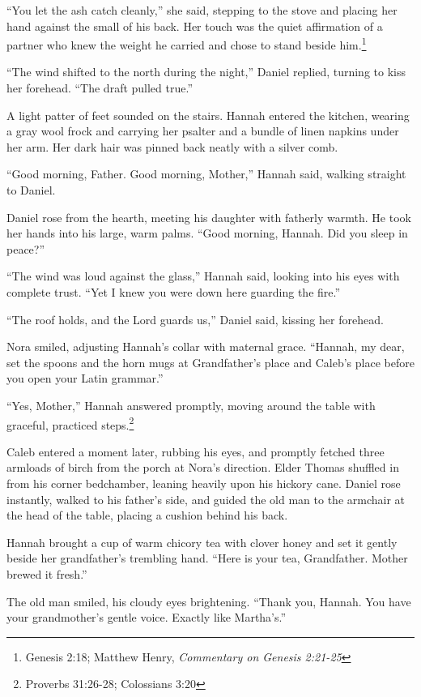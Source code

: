 \documentclass[11pt]{article}
\begin{document}
``You let the ash catch cleanly,'' she said, stepping to the stove and placing her hand against the small of his back. Her touch was the quiet affirmation of a partner who knew the weight he carried and chose to stand beside him.\footnote{Genesis 2:18; Matthew Henry, \textit{Commentary on Genesis 2:21-25}}

``The wind shifted to the north during the night,'' Daniel replied, turning to kiss her forehead. ``The draft pulled true.''

A light patter of feet sounded on the stairs. Hannah entered the kitchen, wearing a gray wool frock and carrying her psalter and a bundle of linen napkins under her arm. Her dark hair was pinned back neatly with a silver comb.

``Good morning, Father. Good morning, Mother,'' Hannah said, walking straight to Daniel.

Daniel rose from the hearth, meeting his daughter with fatherly warmth. He took her hands into his large, warm palms. ``Good morning, Hannah. Did you sleep in peace?''

``The wind was loud against the glass,'' Hannah said, looking into his eyes with complete trust. ``Yet I knew you were down here guarding the fire.''

``The roof holds, and the Lord guards us,'' Daniel said, kissing her forehead.

Nora smiled, adjusting Hannah's collar with maternal grace. ``Hannah, my dear, set the spoons and the horn mugs at Grandfather's place and Caleb's place before you open your Latin grammar.''

``Yes, Mother,'' Hannah answered promptly, moving around the table with graceful, practiced steps.\footnote{Proverbs 31:26-28; Colossians 3:20}

Caleb entered a moment later, rubbing his eyes, and promptly fetched three armloads of birch from the porch at Nora's direction. Elder Thomas shuffled in from his corner bedchamber, leaning heavily upon his hickory cane. Daniel rose instantly, walked to his father's side, and guided the old man to the armchair at the head of the table, placing a cushion behind his back.

Hannah brought a cup of warm chicory tea with clover honey and set it gently beside her grandfather's trembling hand. ``Here is your tea, Grandfather. Mother brewed it fresh.''

The old man smiled, his cloudy eyes brightening. ``Thank you, Hannah. You have your grandmother's gentle voice. Exactly like Martha's.''
\end{document}

